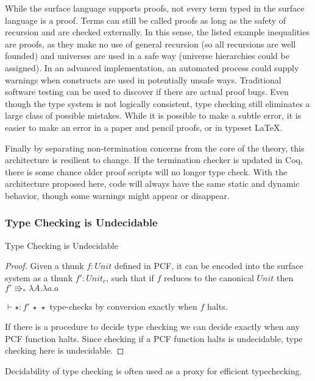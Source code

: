 
While the surface language supports proofs, not every term typed in the surface language is a proof.
Terms can still be called proofs as long as the safety of recursion and \tit{} are checked externally.
In this sense, the listed example inequalities are proofs, as they make no use of general recursion (so all recursions are well founded) and universes are used in a safe way (universe hierarchies could be assigned).
In an advanced implementation, an automated process could supply warnings when constructs are used in potentially unsafe ways.
Traditional software testing can be used to discover if there are actual proof bugs.
Even though the type system is not logically consistent, type checking still eliminates a large class of possible mistakes.
While it is possible to make a subtle error, it is easier to make an error in a paper and pencil proofs, or in typeset \LaTeX.

Finally by separating non-termination concerns from the core of the theory, this architecture is resilient to change.
If the termination checker is updated in Coq, there is some chance older proof scripts will no longer type check.
With the architecture proposed here, code will always have the same static and dynamic behavior, though some warnings might appear or disappear.

\subsubsection{Type Checking is Undecidable}
\begin{thm}
Type Checking is Undecidable
\end{thm}

\begin{proof}
Given a thunk $f:Unit$ defined in PCF, it can be encoded into the surface system as a thunk $f':Unit_{c}$, such that if $f$ reduces to the canonical $Unit$ then $f'\Rrightarrow_{\ast}\lambda A.\lambda a.a$ 

$\vdash\star:f'\,\star\,\star$ type-checks by conversion exactly when $f$ halts.

If there is a procedure to decide type checking we can decide exactly when any PCF function halts.
Since checking if a PCF function halts is undecidable, type checking here is undecidable.

\end{proof}
Decidability of type checking is often used as a proxy for efficient typechecking.

